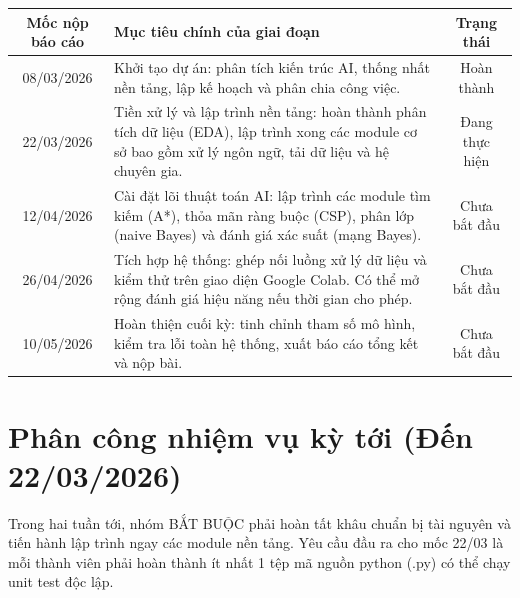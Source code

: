 \documentclass[a4paper, 12pt]{article}
\begin{document}
\begin{table}[h!]
    \centering
    \renewcommand{\arraystretch}{1.3}
    \begin{tabularx}{\textwidth}{|c|X|c|}
        \hline
        \textbf{Mốc nộp báo cáo} & \textbf{Mục tiêu chính của giai đoạn} & \textbf{Trạng thái} \\
        \hline
        08/03/2026 & Khởi tạo dự án: phân tích kiến trúc AI, thống nhất nền tảng, lập kế hoạch và phân chia công việc. & Hoàn thành \\
        \hline
        22/03/2026 & Tiền xử lý và lập trình nền tảng: hoàn thành phân tích dữ liệu (EDA), lập trình xong các module cơ sở bao gồm xử lý ngôn ngữ, tải dữ liệu và hệ chuyên gia. & Đang thực hiện \\
        \hline
        12/04/2026 & Cài đặt lõi thuật toán AI: lập trình các module tìm kiếm (A*), thỏa mãn ràng buộc (CSP), phân lớp (naive Bayes) và đánh giá xác suất (mạng Bayes). & Chưa bắt đầu \\
        \hline
        26/04/2026 & Tích hợp hệ thống: ghép nối luồng xử lý dữ liệu và kiểm thử trên giao diện Google Colab. Có thể mở rộng đánh giá hiệu năng nếu thời gian cho phép. & Chưa bắt đầu \\
        \hline
        10/05/2026 & Hoàn thiện cuối kỳ: tinh chỉnh tham số mô hình, kiểm tra lỗi toàn hệ thống, xuất báo cáo tổng kết và nộp bài. & Chưa bắt đầu \\
        \hline
    \end{tabularx}
\end{table}

\section{Phân công nhiệm vụ kỳ tới (Đến 22/03/2026)}
Trong hai tuần tới, nhóm BẮT BUỘC phải hoàn tất khâu chuẩn bị tài nguyên và tiến hành lập trình ngay các module nền tảng. Yêu cầu đầu ra cho mốc 22/03 là mỗi thành viên phải hoàn thành ít nhất 1 tệp mã nguồn python (.py) có thể chạy unit test độc lập.
\end{document}
